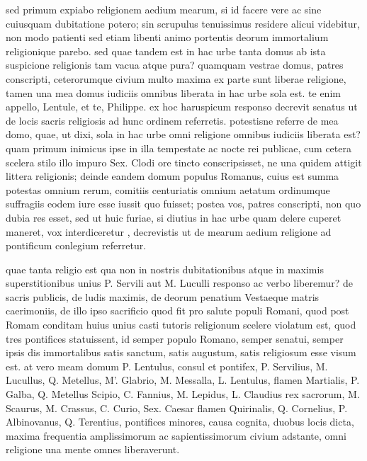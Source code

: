  sed primum expiabo religionem aedium mearum, si id facere vere ac sine cuiusquam dubitatione potero; sin scrupulus tenuissimus residere alicui videbitur, non modo patienti sed etiam libenti animo portentis deorum immortalium religionique parebo. sed quae tandem est in hac urbe tanta domus ab ista suspicione religionis tam vacua atque pura? quamquam vestrae domus, patres conscripti, ceterorumque civium multo maxima ex parte sunt liberae religione, tamen una mea domus iudiciis omnibus liberata in hac urbe sola est. te enim appello, Lentule, et te, Philippe. ex hoc haruspicum responso decrevit senatus ut de locis sacris religiosis ad hunc ordinem referretis. potestisne referre de mea domo, quae, ut dixi, sola in hac urbe omni religione omnibus iudiciis liberata est? quam primum inimicus ipse in illa tempestate ac nocte rei publicae, cum cetera scelera stilo illo impuro Sex. Clodi ore tincto conscripsisset, ne una quidem attigit littera religionis; deinde eandem domum populus Romanus, cuius est summa potestas omnium rerum, comitiis centuriatis omnium aetatum ordinumque suffragiis eodem iure esse iussit quo fuisset; postea vos, patres conscripti, non quo dubia res esset, sed ut huic furiae, si diutius in hac urbe quam delere cuperet maneret, vox interdiceretur , decrevistis ut de mearum aedium religione ad pontificum conlegium referretur.

 quae tanta religio est qua non in nostris dubitationibus atque in maximis superstitionibus unius P. Servili aut M. Luculli responso ac verbo liberemur? de sacris publicis, de ludis maximis, de deorum penatium Vestaeque matris caerimoniis, de illo ipso sacrificio quod fit pro salute populi Romani, quod post Romam conditam huius unius casti tutoris religionum scelere violatum est, quod tres pontifices statuissent, id semper populo Romano, semper senatui, semper ipsis dis immortalibus satis sanctum, satis augustum, satis religiosum esse visum est. at vero meam domum P. Lentulus, consul et pontifex, P. Servilius, M. Lucullus, Q. Metellus, M'. Glabrio, M. Messalla, L. Lentulus, flamen Martialis, P. Galba, Q. Metellus Scipio, C. Fannius, M. Lepidus, L. Claudius rex sacrorum, M. Scaurus, M. Crassus, C. Curio, Sex. Caesar flamen Quirinalis, Q. Cornelius, P. Albinovanus, Q. Terentius, pontifices minores, causa cognita, duobus locis dicta, maxima frequentia amplissimorum ac sapientissimorum civium adstante, omni religione una mente omnes liberaverunt.

